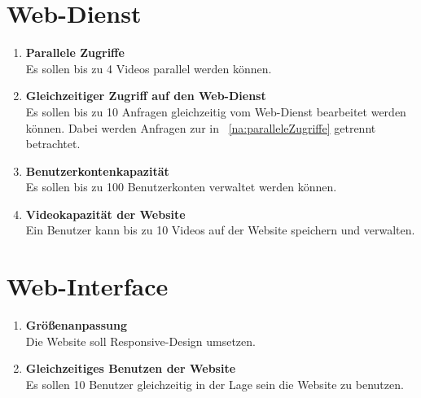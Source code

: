 \section{\gls{Web-Dienst}}
\begin{enumerate}
\renewcommand{\labelenumi}{\textbf{\theenumi}}
\renewcommand{\theenumi}{NA\arabic{enumi}0}
\setcounter{enumi}{199}

\item \label{na:paralleleZugriffe}\textbf{Parallele Zugriffe} \hfill\\  Es sollen bis zu 4 Videos parallel  werden können.

\item \textbf{Gleichzeitiger Zugriff auf den \gls{Web-Dienst}} \hfill\\  Es sollen bis zu 10 Anfragen gleichzeitig vom \gls{Web-Dienst} bearbeitet werden können. Dabei werden Anfragen zur  in ~\eqref{na:paralleleZugriffe} getrennt betrachtet.

\item \textbf{Benutzerkontenkapazität} \hfill\\  Es sollen bis zu 100 Benutzerkonten verwaltet werden können.

\item \label{na:VideoKap}\textbf{Videokapazität der Website} \hfill\\  Ein Benutzer kann bis zu 10 Videos auf der Website speichern und verwalten.

\end{enumerate}

\section{\gls{Web-Interface}}
\begin{enumerate}
\renewcommand{\labelenumi}{\textbf{\theenumi}}
\renewcommand{\theenumi}{NA\arabic{enumi}0}
\setcounter{enumi}{299}

\item \textbf{Größenanpassung} \hfill\\  Die Website soll \gls{Responsive-Design} umsetzen.

\item \textbf{Gleichzeitiges Benutzen der Website} \hfill\\  Es sollen 10 Benutzer gleichzeitig in der Lage sein die Website zu benutzen.

\end{enumerate}





